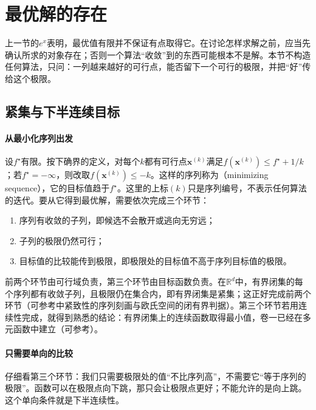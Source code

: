 \section{最优解的存在}
\label{sec:opt-prob-existence}

上一节的$e^x$表明，最优值有限并不保证有点取得它。在讨论怎样求解之前，应当先确认所求的对象存在；否则一个算法“收敛”到的东西可能根本不是解。本节不构造任何算法，只问：一列越来越好的可行点，能否留下一个可行的极限，并把“好”传给这个极限。

\subsection{紧集与下半连续目标}
\label{sec:opt-prob-compact-lsc}

\paragraph{从最小化序列出发}
设$f^\star$有限。按下确界的定义，对每个$k$都有可行点$\bm x^{(k)}$满足$f(\bm x^{(k)})\leq f^\star+1/k$；若$f^\star=-\infty$，则改取$f(\bm x^{(k)})\leq-k$。这样的序列称为（minimizing sequence），它的目标值趋于$f^\star$。这里的上标$(k)$只是序列编号，不表示任何算法的迭代。要从它得到最优解，需要依次完成三个环节：

\begin{enumerate}
  \item 序列有收敛的子列，即候选不会散开或逃向无穷远；
  \item 子列的极限仍然可行；
  \item 目标值的比较能传到极限，即极限处的目标值不高于序列目标值的极限。
\end{enumerate}

前两个环节由可行域负责，第三个环节由目标函数负责。在$\mathbb R^d$中，有界闭集的每个序列都有收敛子列，且极限仍在集合内，即有界闭集是紧集；这正好完成前两个环节（可参考中紧致性的序列刻画与欧氏空间的闭有界判据）。第三个环节若用连续性完成，就得到熟悉的结论：有界闭集上的连续函数取得最小值，卷一已经在多元函数中建立（可参考）。

\paragraph{只需要单向的比较}
仔细看第三个环节：我们只需要极限处的值“不比序列高”，不需要它“等于序列的极限”。函数可以在极限点向下跳，那只会让极限点更好；不能允许的是向上跳。这个单向条件就是下半连续性。

